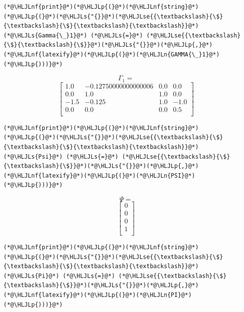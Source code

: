 \documentclass[12pt,a4paper]{article}
\newcommand{\HLJLn}[1]{#1}
\newcommand{\HLJLnf}[1]{\textcolor[RGB]{66,102,213}{#1}}
\newcommand{\HLJLs}[1]{\textcolor[RGB]{201,61,57}{#1}}
\newcommand{\HLJLse}[1]{\textcolor[RGB]{59,151,46}{#1}}
\newcommand{\HLJLp}[1]{#1}
\begin{document}
\begin{lstlisting}
(*@\HLJLnf{print}@*)(*@\HLJLp{(}@*)(*@\HLJLnf{string}@*)(*@\HLJLp{(}@*)(*@\HLJLs{"{}}@*)(*@\HLJLse{{\textbackslash}{\$}{\textbackslash}{\$}{\textbackslash}{\textbackslash}}@*)(*@\HLJLs{Gamma{\_}1}@*) (*@\HLJLs{=}@*) (*@\HLJLse{{\textbackslash}{\$}{\textbackslash}{\$}}@*)(*@\HLJLs{"{}}@*)(*@\HLJLp{,}@*)(*@\HLJLnf{latexify}@*)(*@\HLJLp{(}@*)(*@\HLJLn{GAMMA{\_}1}@*)(*@\HLJLp{)))}@*)
\end{lstlisting}

$$\Gamma_1 = $$\begin{equation}
\left[
\begin{array}{cccc}
1.0 & -0.12750000000000006 & 0.0 & 0.0 \\
0.0 & 1.0 & 1.0 & 0.0 \\
-1.5 & -0.125 & 1.0 & -1.0 \\
0.0 & 0.0 & 0.0 & 0.5 \\
\end{array}
\right]
\end{equation}


\begin{lstlisting}
(*@\HLJLnf{print}@*)(*@\HLJLp{(}@*)(*@\HLJLnf{string}@*)(*@\HLJLp{(}@*)(*@\HLJLs{"{}}@*)(*@\HLJLse{{\textbackslash}{\$}{\textbackslash}{\$}{\textbackslash}{\textbackslash}}@*)(*@\HLJLs{Psi}@*) (*@\HLJLs{=}@*) (*@\HLJLse{{\textbackslash}{\$}{\textbackslash}{\$}}@*)(*@\HLJLs{"{}}@*)(*@\HLJLp{,}@*)(*@\HLJLnf{latexify}@*)(*@\HLJLp{(}@*)(*@\HLJLn{PSI}@*)(*@\HLJLp{)))}@*)
\end{lstlisting}

$$\Psi = $$\begin{equation}
\left[
\begin{array}{c}
0 \\
0 \\
0 \\
1 \\
\end{array}
\right]
\end{equation}


\begin{lstlisting}
(*@\HLJLnf{print}@*)(*@\HLJLp{(}@*)(*@\HLJLnf{string}@*)(*@\HLJLp{(}@*)(*@\HLJLs{"{}}@*)(*@\HLJLse{{\textbackslash}{\$}{\textbackslash}{\$}{\textbackslash}{\textbackslash}}@*)(*@\HLJLs{Pi}@*) (*@\HLJLs{=}@*) (*@\HLJLse{{\textbackslash}{\$}{\textbackslash}{\$}}@*)(*@\HLJLs{"{}}@*)(*@\HLJLp{,}@*)(*@\HLJLnf{latexify}@*)(*@\HLJLp{(}@*)(*@\HLJLn{PI}@*)(*@\HLJLp{)))}@*)
\end{lstlisting}
\end{document}
